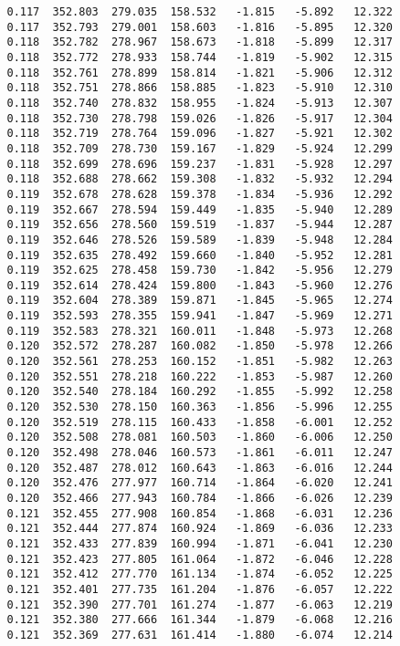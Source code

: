 \begin{verbatim}
   0.117  352.803  279.035  158.532   -1.815   -5.892   12.322
   0.117  352.793  279.001  158.603   -1.816   -5.895   12.320
   0.118  352.782  278.967  158.673   -1.818   -5.899   12.317
   0.118  352.772  278.933  158.744   -1.819   -5.902   12.315
   0.118  352.761  278.899  158.814   -1.821   -5.906   12.312
   0.118  352.751  278.866  158.885   -1.823   -5.910   12.310
   0.118  352.740  278.832  158.955   -1.824   -5.913   12.307
   0.118  352.730  278.798  159.026   -1.826   -5.917   12.304
   0.118  352.719  278.764  159.096   -1.827   -5.921   12.302
   0.118  352.709  278.730  159.167   -1.829   -5.924   12.299
   0.118  352.699  278.696  159.237   -1.831   -5.928   12.297
   0.118  352.688  278.662  159.308   -1.832   -5.932   12.294
   0.119  352.678  278.628  159.378   -1.834   -5.936   12.292
   0.119  352.667  278.594  159.449   -1.835   -5.940   12.289
   0.119  352.656  278.560  159.519   -1.837   -5.944   12.287
   0.119  352.646  278.526  159.589   -1.839   -5.948   12.284
   0.119  352.635  278.492  159.660   -1.840   -5.952   12.281
   0.119  352.625  278.458  159.730   -1.842   -5.956   12.279
   0.119  352.614  278.424  159.800   -1.843   -5.960   12.276
   0.119  352.604  278.389  159.871   -1.845   -5.965   12.274
   0.119  352.593  278.355  159.941   -1.847   -5.969   12.271
   0.119  352.583  278.321  160.011   -1.848   -5.973   12.268
   0.120  352.572  278.287  160.082   -1.850   -5.978   12.266
   0.120  352.561  278.253  160.152   -1.851   -5.982   12.263
   0.120  352.551  278.218  160.222   -1.853   -5.987   12.260
   0.120  352.540  278.184  160.292   -1.855   -5.992   12.258
   0.120  352.530  278.150  160.363   -1.856   -5.996   12.255
   0.120  352.519  278.115  160.433   -1.858   -6.001   12.252
   0.120  352.508  278.081  160.503   -1.860   -6.006   12.250
   0.120  352.498  278.046  160.573   -1.861   -6.011   12.247
   0.120  352.487  278.012  160.643   -1.863   -6.016   12.244
   0.120  352.476  277.977  160.714   -1.864   -6.020   12.241
   0.120  352.466  277.943  160.784   -1.866   -6.026   12.239
   0.121  352.455  277.908  160.854   -1.868   -6.031   12.236
   0.121  352.444  277.874  160.924   -1.869   -6.036   12.233
   0.121  352.433  277.839  160.994   -1.871   -6.041   12.230
   0.121  352.423  277.805  161.064   -1.872   -6.046   12.228
   0.121  352.412  277.770  161.134   -1.874   -6.052   12.225
   0.121  352.401  277.735  161.204   -1.876   -6.057   12.222
   0.121  352.390  277.701  161.274   -1.877   -6.063   12.219
   0.121  352.380  277.666  161.344   -1.879   -6.068   12.216
   0.121  352.369  277.631  161.414   -1.880   -6.074   12.214

\end{verbatim}
